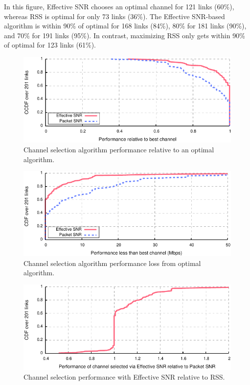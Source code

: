 In this figure, Effective SNR chooses an optimal channel for 121 links (60\%), whereas RSS is optimal for only 73 links (36\%). The Effective SNR-based algorithm is within 90\% of optimal for 168 links (84\%), 80\% for 181 links (90\%), and 70\% for 191 links (95\%). In contrast, maximizing RSS only gets within 90\% of optimal for 123 links (61\%).

\begin{figure}[p]
	\centering
	\includegraphics[width=\textwidth]{figures/applications/chan_sel_ratio_opt.pdf}
	\caption{\label{fig:chan_sel_ratio_opt}Channel selection algorithm performance relative to an optimal algorithm.}
\end{figure}
\begin{figure}[p]
	\centering
	\includegraphics[width=\textwidth]{figures/applications/chan_sel_diff_opt.pdf}
	\caption{\label{fig:chan_sel_delta_opt}Channel selection algorithm performance loss from optimal algorithm.}
\end{figure}
\begin{figure}[p]
	\centering
	\includegraphics[width=\textwidth]{figures/applications/chan_sel_ratio.pdf}
	\caption{\label{fig:chan_sel_ratio}Channel selection performance with Effective SNR relative to RSS\@.}
\end{figure}

